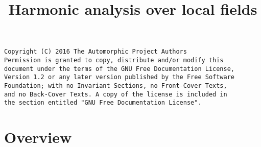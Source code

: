 

%

\newcommand{\TAG}{ZZZZ}

\title{Harmonic analysis over local fields}


\maketitle

\label{section-phantom}
\hypertarget{0300}{}
\reversemarginpar{}

\begin{verbatim}
Copyright (C) 2016 The Automorphic Project Authors
Permission is granted to copy, distribute and/or modify this
document under the terms of the GNU Free Documentation License,
Version 1.2 or any later version published by the Free Software
Foundation; with no Invariant Sections, no Front-Cover Texts,
and no Back-Cover Texts. A copy of the license is included in
the section entitled "GNU Free Documentation License".
\end{verbatim}

\tableofcontents


\section{Overview}
\label{section-overview}
\hypertarget{0301}{}
\reversemarginpar{}








